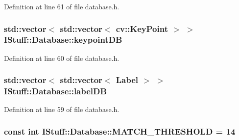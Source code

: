 Definition at line 61 of file database.\-h.

\hypertarget{class_i_stuff_1_1_database_a9e5ee68bf2517bcc87fa38b3519897ee}{
\subsubsection[{keypoint\-D\-B}]{\setlength{\rightskip}{0pt plus 5cm}std\-::vector$<$ std\-::vector$<$ cv\-::\-Key\-Point $>$ $>$ I\-Stuff\-::\-Database\-::keypoint\-D\-B\hspace{0.3cm}{\ttfamily [private]}}}\label{class_i_stuff_1_1_database_a9e5ee68bf2517bcc87fa38b3519897ee}


Definition at line 60 of file database.\-h.

\hypertarget{class_i_stuff_1_1_database_a6d83fe3176ec13b1847ab7600e8e230c}{
\subsubsection[{label\-D\-B}]{\setlength{\rightskip}{0pt plus 5cm}std\-::vector$<$ std\-::vector$<$ {\bf Label} $>$ $>$ I\-Stuff\-::\-Database\-::label\-D\-B\hspace{0.3cm}{\ttfamily [private]}}}\label{class_i_stuff_1_1_database_a6d83fe3176ec13b1847ab7600e8e230c}


Definition at line 59 of file database.\-h.

\hypertarget{class_i_stuff_1_1_database_addc638b6be97feec274eb995ffd1d937}{
\subsubsection[{M\-A\-T\-C\-H\-\_\-\-T\-H\-R\-E\-S\-H\-O\-L\-D}]{\setlength{\rightskip}{0pt plus 5cm}const int I\-Stuff\-::\-Database\-::\-M\-A\-T\-C\-H\-\_\-\-T\-H\-R\-E\-S\-H\-O\-L\-D = 14\hspace{0.3cm}{\ttfamily [private]}}}\label{class_i_stuff_1_1_database_addc638b6be97feec274eb995ffd1d937}


